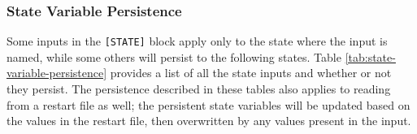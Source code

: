 \subsubsection{State Variable Persistence}

Some inputs in the \texttt{[STATE]} block apply only to the state where the input is named, while some others will persist to the following states.  Table \ref{tab:state-variable-persistence} provides a list of all the state inputs and whether or not they persist.  The persistence described in these tables also applies to reading from a restart file as well; the persistent state variables will be updated based on the values in the restart file, then overwritten by any values present in the input.

\begin{table}[h]
    \centering
        \caption{List of state variables and their persistence between states}
\end{table}
